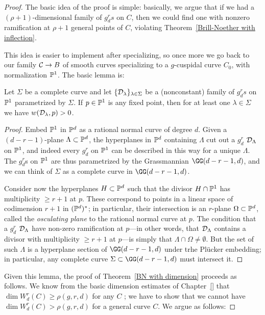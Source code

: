 \begin{proof}
The basic idea of the proof is simple: basically, we argue that if we had a $(\rho+1)$-dimensional family of $g^r_ds$ on $C$, then we could find one with nonzero ramification at $\rho+1$ general points of $C$, violating Theorem~\ref{Brill-Noether with inflection}. 

This idea is easier to implement after specializing, so once more we go back to our family $\cC \to B$ of smooth curves specializing to a $g$-cuspidal curve $C_0$, with normalization $\PP^1$. The basic lemma is:

\begin{lemma}\label{forced ramification}
Let $\Sigma$ be a complete curve and let $\{ \cD_\lambda \}_{\lambda \in \Sigma}$ be a (nonconstant) family of $g^r_ds$ on $\PP^1$ parametrized by $\Sigma$. If $p \in \PP^1$ is any fixed point, then for at least one $\lambda \in \Sigma$ we have $w(\cD_\lambda,p)>0$.
\end{lemma}

\begin{proof}
Embed $\PP^1$ in $\PP^d$ as a rational normal curve of degree $d$. Given a $(d-r-1)$-plane $\Lambda \subset \PP^d$, the hyperplanes in $\PP^d$ containing $\Lambda$ cut out a $g^r_d$ $\cD_\Lambda$ on $\PP^1$, and indeed every $g^r_d$ on $\PP^1$ can be described in this way for a unique $\Lambda$. The $g^r_d$s on $\PP^1$ are thus parametrized by the Grassmannian $\GG(d-r-1,d)$, and we can think of $\Sigma$ as a complete curve in $\GG(d-r-1,d)$.

Consider now the hyperplanes $H \subset \PP^d$ such that the divisor $H \cap \PP^1$ has multiplicity $\geq r+1$ at $p$. These correspond to points in a linear space of codimension $r+1$ in $(\PP^d)^*$; in particular, their intersection is an $r$-plane $\Omega \subset \PP^d$, called the \emph{osculating plane} to the rational normal curve at $p$. The condition that a  $g^r_d$ $\cD_\Lambda$ have non-zero ramification at $p$---in other words, that $\cD_\Lambda$ contains a divisor with multiplicity $\geq r+1$ at $p$---is simply that $\Lambda \cap \Omega \neq \emptyset$. But the set of such $\Lambda$ is a hyperplane section of $\GG(d-r-1,d)$ under trhe Pl\"ucker embedding; in particular, any complete curve $\Sigma \subset \GG(d-r-1,d)$ must intersect it.
\end{proof}

Given this lemma, the proof of Theorem~\ref{BN with dimension} proceeds as follows. We know from the basic dimension estimates of Chapter~\ref{} that $\dim W^r_d(C) \geq \rho(g,r,d)$ for any $C$ ; we have to show that we cannot have $\dim W^r_d(C) > \rho(g,r,d)$ for a general curve $C$. We argue as follows:


\end{proof}
